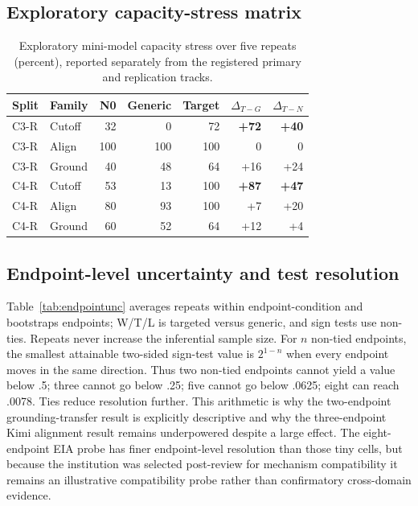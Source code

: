 \subsection{Exploratory capacity-stress matrix}
\begin{table}[ht]
\centering
\small
\setlength{\tabcolsep}{4pt}
\begin{tabular}{llrrrrr}
\toprule
Split & Family & N0 & Generic & Target & $\Delta_{T-G}$ & $\Delta_{T-N}$ \\
\midrule
C3-R & Cutoff & 32 & 0 & 72 & \textbf{+72} & \textbf{+40} \\
C3-R & Align & 100 & 100 & 100 & 0 & 0 \\
C3-R & Ground & 40 & 48 & 64 & +16 & +24 \\
C4-R & Cutoff & 53 & 13 & 100 & \textbf{+87} & \textbf{+47} \\
C4-R & Align & 80 & 93 & 100 & +7 & +20 \\
C4-R & Ground & 60 & 52 & 64 & +12 & +4 \\
\bottomrule
\end{tabular}
\caption{Exploratory mini-model capacity stress over five repeats (percent), reported separately from the registered primary and replication tracks.}
\label{tab:capacity}
\end{table}

\subsection{Endpoint-level uncertainty and test resolution}
Table~\ref{tab:endpointunc} averages repeats within endpoint-condition and bootstraps endpoints; W/T/L is targeted versus generic, and sign tests use non-ties. Repeats never increase the inferential sample size. For $n$ non-tied endpoints, the smallest attainable two-sided sign-test value is $2^{1-n}$ when every endpoint moves in the same direction. Thus two non-tied endpoints cannot yield a value below .5; three cannot go below .25; five cannot go below .0625; eight can reach .0078. Ties reduce resolution further. This arithmetic is why the two-endpoint grounding-transfer result is explicitly descriptive and why the three-endpoint Kimi alignment result remains underpowered despite a large effect. The eight-endpoint EIA probe has finer endpoint-level resolution than those tiny cells, but because the institution was selected post-review for mechanism compatibility it remains an illustrative compatibility probe rather than confirmatory cross-domain evidence.

